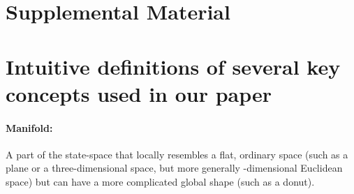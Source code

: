\documentclass{article} %
\newcounter{ct}
\theoremstyle{definition}
\theoremstyle{remark}
\begin{document}

\small

\newpage
%


%

\newpage
\appendix
\section*{Supplemental Material}
\setcounter{section}{0}
\renewcommand{\thefigure}{S\arabic{figure}} %
\renewcommand{\thesection}{S\arabic{section}} %

%


\section{Intuitive definitions of several key concepts used in our paper}\label{sec:supp:simplifications}

\paragraph{Manifold:} A part of the state-space that locally resembles a flat, ordinary space (such as a plane or a three-dimensional space, but more generally
-dimensional Euclidean space) but can have a more complicated global shape (such as a donut).\label{sec:supp:manifold}
\end{document}
